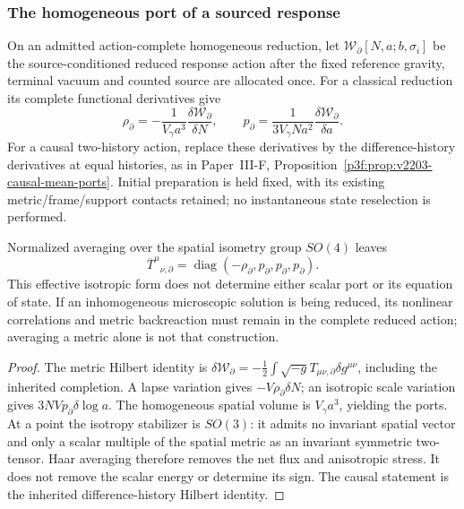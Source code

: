 \documentclass[12pt,a4paper]{article}
\begin{document}
\subsubsection{The homogeneous port of a sourced response}
\begin{proposition}
\label{p8:prop:v2205-homogeneous-two-ports}
On an admitted action-complete homogeneous reduction, let
$\mathcal W_\partial[N,a;b,\sigma_i]$ be the source-conditioned reduced
response action after the fixed reference gravity, terminal vacuum and
counted source are allocated once. For a classical reduction its complete
functional derivatives give
\begin{equation}
\label{p8:eq:v2205-homogeneous-two-ports}
 \boxed{\rho_\partial=-\frac1{V_\gamma a^3}
                 \frac{\delta\mathcal W_\partial}{\delta N},\qquad
 p_\partial=\frac1{3V_\gamma Na^2}
                 \frac{\delta\mathcal W_\partial}{\delta a}.}
\end{equation}
For a causal two-history action, replace these derivatives by the
difference-history derivatives at equal histories, as in
Paper~III-F, Proposition~\ref{p3f:prop:v2203-causal-mean-ports}.
Initial preparation is held fixed, with its existing metric/frame/support
contacts retained; no instantaneous state reselection is performed.

Normalized averaging over the spatial isometry group $SO(4)$ leaves
\[
 \overline{T}^{\mu}{}_{\nu,\partial}
 =\operatorname{diag}(-\rho_\partial,p_\partial,p_\partial,p_\partial).
\]
This effective isotropic form does not determine either scalar port or
its equation of state. If an inhomogeneous microscopic solution is being
reduced, its nonlinear correlations and metric backreaction must remain
in the complete reduced action; averaging a metric alone is not that
construction.
\end{proposition}
\begin{proof}
The metric Hilbert identity is
$\delta\mathcal W_\partial=-\tfrac12\int\sqrt{-g}
T_{\mu\nu,\partial}\delta g^{\mu\nu}$, including the inherited
completion. A lapse variation gives $-V\rho_\partial\delta N$;
an isotropic scale variation gives $3NVp_\partial\delta\log a$.
The homogeneous spatial volume is $V_\gamma a^3$, yielding the ports.
At a point the isotropy stabilizer is $SO(3)$: it admits no invariant
spatial vector and only a scalar multiple of the spatial metric as an
invariant symmetric two-tensor. Haar averaging therefore removes the
net flux and anisotropic stress. It does not remove the scalar energy
or determine its sign. The causal statement is the inherited
difference-history Hilbert identity.
\end{proof}
\end{document}

